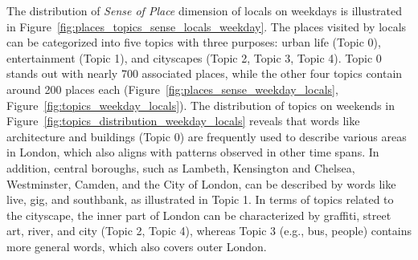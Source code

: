 \documentclass{article}
\theoremstyle{remark}
\begin{document}
The distribution of \textit{Sense of Place} dimension of locals on weekdays is illustrated in Figure~\ref{fig:places_topics_sense_locals_weekday}. The places visited by locals can be categorized into five topics with three purposes: urban life (Topic 0), entertainment (Topic 1), and cityscapes (Topic 2, Topic 3, Topic 4). Topic 0 stands out with nearly 700 associated places, while the other four topics contain around 200 places each (Figure~\ref{fig:places_sense_weekday_locals}, Figure~\ref{fig:topics_weekday_locals}). The distribution of topics on weekends in Figure~\ref{fig:topics_distribution_weekday_locals} reveals that words like architecture and buildings (Topic 0) are frequently used to describe various areas in London, which also aligns with patterns observed in other time spans. In addition, central boroughs, such as Lambeth, Kensington and Chelsea, Westminster, Camden, and the City of London, can be described by words like live, gig, and southbank, as illustrated in Topic 1. In terms of topics related to the cityscape, the inner part of London can be characterized by graffiti, street art, river, and city (Topic 2, Topic 4), whereas Topic 3 (e.g., bus, people) contains more general words, which also covers outer London.
\end{document}
